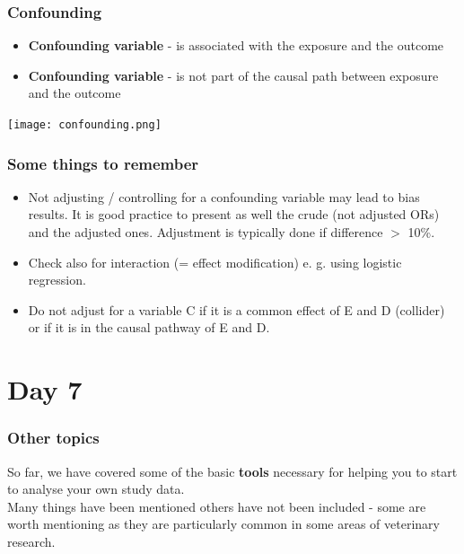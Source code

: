 \documentclass{beamer}\usepackage[]{graphicx}\usepackage[]{color}
\begin{document}
{{{
\begin{frame}[fragile]
\frametitle{Confounding}
\begin{itemize}
\item {\bfseries Confounding variable} - is associated with the exposure and the outcome
\item {\bfseries Confounding variable} - is not part of the causal path between exposure and the outcome
\end{itemize}
\begin{center}
\texttt{[image: confounding.png]} 
\end{center}
\end{frame}


\usebackgroundtemplate{}
\begin{frame}
\frametitle{Some things to remember}
\begin{itemize}
\setlength\itemsep{1.5em}
\item Not adjusting / controlling for a confounding variable may lead to bias
results. It is good practice to present as well the crude (not adjusted ORs)
and the adjusted ones. Adjustment is typically done if difference $>$ 10\%. 
\item Check also for interaction (= effect modification) e. g. using logistic
regression.
\item Do not adjust for a variable C if it is a common effect of E and D
(collider) or if it is in the causal pathway of E and D.
\end{itemize}
\end{frame}


\usebackgroundtemplate{}
\section{Day 7}
\begin{frame}
\frametitle{Other topics}
So far, we have covered some of the basic {\bfseries tools} necessary for
helping you to start to analyse your own study data.\\ \vspace{0.5cm}
Many things have been mentioned others have not been included - some are worth
mentioning as they are particularly common in some areas of veterinary research.
\end{frame}

}}}
\end{document}
